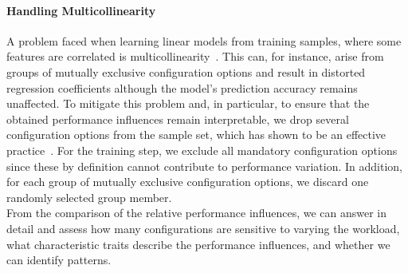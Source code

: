 {\paragraph*{Handling Multicollinearity}A problem faced when learning linear models from training samples, where some features are correlated is multicollinearity~\cite{Daoud_2017}. This can, for instance, arise from groups of mutually exclusive configuration options and result in distorted regression coefficients although the model's prediction accuracy remains unaffected. To mitigate this problem and, in particular, to ensure that the obtained performance influences remain interpretable, we drop several configuration options from the sample set, which has shown to be an effective practice~\cite{dorn2020}. For the training step, we exclude all mandatory configuration options since these by definition cannot contribute to performance variation. In addition, for each group of mutually exclusive configuration options, we discard one randomly selected group member. \\

From the comparison of the relative performance influences, we can answer  in detail and assess how many configurations are sensitive to varying the workload, what characteristic traits describe the performance influences, and whether we can identify patterns.
}
